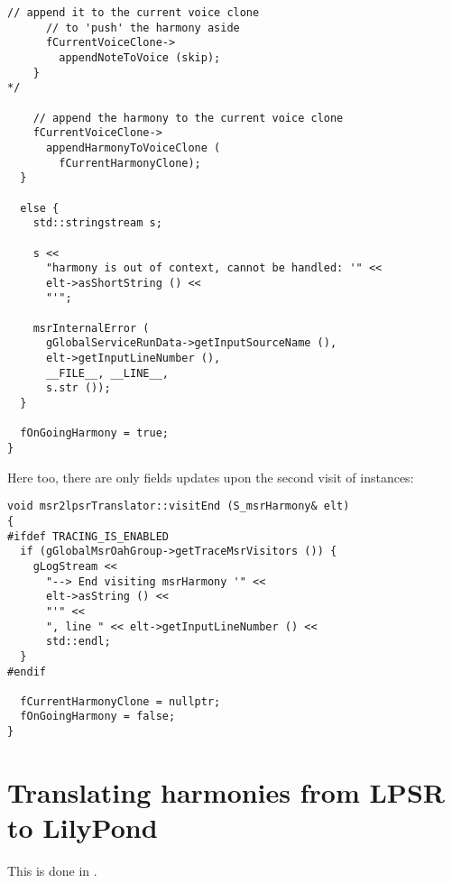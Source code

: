 \begin{lstlisting}[language=CPlusPlus]
      // append it to the current voice clone
      // to 'push' the harmony aside
      fCurrentVoiceClone->
        appendNoteToVoice (skip);
    }
*/

    // append the harmony to the current voice clone
    fCurrentVoiceClone->
      appendHarmonyToVoiceClone (
        fCurrentHarmonyClone);
  }

  else {
    std::stringstream s;

    s <<
      "harmony is out of context, cannot be handled: '" <<
      elt->asShortString () <<
      "'";

    msrInternalError (
      gGlobalServiceRunData->getInputSourceName (),
      elt->getInputLineNumber (),
      __FILE__, __LINE__,
      s.str ());
  }

  fOnGoingHarmony = true;
}
\end{lstlisting}

\pagebreak

Here too, there are only fields updates upon the second visit of  instances:
\begin{lstlisting}[language=CPlusPlus]
void msr2lpsrTranslator::visitEnd (S_msrHarmony& elt)
{
#ifdef TRACING_IS_ENABLED
  if (gGlobalMsrOahGroup->getTraceMsrVisitors ()) {
    gLogStream <<
      "--> End visiting msrHarmony '" <<
      elt->asString () <<
      "'" <<
      ", line " << elt->getInputLineNumber () <<
      std::endl;
  }
#endif

  fCurrentHarmonyClone = nullptr;
  fOnGoingHarmony = false;
}
\end{lstlisting}


\section{Translating harmonies from LPSR to LilyPond}

This is done in \lpsrToLilypond{}.

